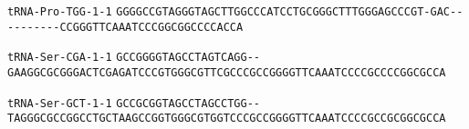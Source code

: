 \documentclass{article}
\newcommand{\rnabox}[1]{\colorbox{#1}{\texttt{#1}}}
\begin{document}
\vspace{-0.5mm}

\texttt{tRNA-Pro-TGG-1-1}
\rnabox{G}\rnabox{G}\rnabox{G}\rnabox{G}\rnabox{C}\rnabox{C}\rnabox{G}\rnabox{T}\rnabox{A}\rnabox{G}\rnabox{G}\rnabox{G}\rnabox{T}\rnabox{A}\rnabox{G}\rnabox{C}\rnabox{T}\rnabox{T}\rnabox{G}\rnabox{G}\rnabox{C}\rnabox{C}\rnabox{C}\rnabox{A}\rnabox{T}\rnabox{C}\rnabox{C}\rnabox{T}\rnabox{G}\rnabox{C}\rnabox{G}\rnabox{G}\rnabox{G}\rnabox{C}\rnabox{T}\rnabox{T}\rnabox{T}\rnabox{G}\rnabox{G}\rnabox{G}\rnabox{A}\rnabox{G}\rnabox{C}\rnabox{C}\rnabox{C}\rnabox{G}\rnabox{T}\rnabox{-}\rnabox{G}\rnabox{A}\rnabox{C}\rnabox{-}\rnabox{-}\rnabox{-}\rnabox{-}\rnabox{-}\rnabox{-}\rnabox{-}\rnabox{-}\rnabox{-}\rnabox{-}\rnabox{C}\rnabox{C}\rnabox{G}\rnabox{G}\rnabox{G}\rnabox{T}\rnabox{T}\rnabox{C}\rnabox{A}\rnabox{A}\rnabox{A}\rnabox{T}\rnabox{C}\rnabox{C}\rnabox{C}\rnabox{G}\rnabox{G}\rnabox{C}\rnabox{G}\rnabox{G}\rnabox{C}\rnabox{C}\rnabox{C}\rnabox{C}\rnabox{A}\rnabox{C}\rnabox{C}\rnabox{A}

\vspace{-0.5mm}

\texttt{tRNA-Ser-CGA-1-1}
\rnabox{G}\rnabox{C}\rnabox{C}\rnabox{G}\rnabox{G}\rnabox{G}\rnabox{G}\rnabox{T}\rnabox{A}\rnabox{G}\rnabox{C}\rnabox{C}\rnabox{T}\rnabox{A}\rnabox{G}\rnabox{T}\rnabox{C}\rnabox{A}\rnabox{G}\rnabox{G}\rnabox{-}\rnabox{-}\rnabox{G}\rnabox{A}\rnabox{A}\rnabox{G}\rnabox{G}\rnabox{C}\rnabox{G}\rnabox{C}\rnabox{G}\rnabox{G}\rnabox{G}\rnabox{A}\rnabox{C}\rnabox{T}\rnabox{C}\rnabox{G}\rnabox{A}\rnabox{G}\rnabox{A}\rnabox{T}\rnabox{C}\rnabox{C}\rnabox{C}\rnabox{G}\rnabox{T}\rnabox{G}\rnabox{G}\rnabox{G}\rnabox{C}\rnabox{G}\rnabox{T}\rnabox{T}\rnabox{C}\rnabox{G}\rnabox{C}\rnabox{C}\rnabox{C}\rnabox{G}\rnabox{C}\rnabox{C}\rnabox{G}\rnabox{G}\rnabox{G}\rnabox{G}\rnabox{T}\rnabox{T}\rnabox{C}\rnabox{A}\rnabox{A}\rnabox{A}\rnabox{T}\rnabox{C}\rnabox{C}\rnabox{C}\rnabox{C}\rnabox{G}\rnabox{C}\rnabox{C}\rnabox{C}\rnabox{C}\rnabox{G}\rnabox{G}\rnabox{C}\rnabox{G}\rnabox{C}\rnabox{C}\rnabox{A}

\vspace{-0.5mm}

\texttt{tRNA-Ser-GCT-1-1}
\rnabox{G}\rnabox{C}\rnabox{C}\rnabox{G}\rnabox{C}\rnabox{G}\rnabox{G}\rnabox{T}\rnabox{A}\rnabox{G}\rnabox{C}\rnabox{C}\rnabox{T}\rnabox{A}\rnabox{G}\rnabox{C}\rnabox{C}\rnabox{T}\rnabox{G}\rnabox{G}\rnabox{-}\rnabox{-}\rnabox{T}\rnabox{A}\rnabox{G}\rnabox{G}\rnabox{G}\rnabox{C}\rnabox{G}\rnabox{C}\rnabox{C}\rnabox{G}\rnabox{G}\rnabox{C}\rnabox{C}\rnabox{T}\rnabox{G}\rnabox{C}\rnabox{T}\rnabox{A}\rnabox{A}\rnabox{G}\rnabox{C}\rnabox{C}\rnabox{G}\rnabox{G}\rnabox{T}\rnabox{G}\rnabox{G}\rnabox{G}\rnabox{C}\rnabox{G}\rnabox{T}\rnabox{G}\rnabox{G}\rnabox{T}\rnabox{C}\rnabox{C}\rnabox{C}\rnabox{G}\rnabox{C}\rnabox{C}\rnabox{G}\rnabox{G}\rnabox{G}\rnabox{G}\rnabox{T}\rnabox{T}\rnabox{C}\rnabox{A}\rnabox{A}\rnabox{A}\rnabox{T}\rnabox{C}\rnabox{C}\rnabox{C}\rnabox{C}\rnabox{G}\rnabox{C}\rnabox{C}\rnabox{G}\rnabox{C}\rnabox{G}\rnabox{G}\rnabox{C}\rnabox{G}\rnabox{C}\rnabox{C}\rnabox{A}
\end{document}
